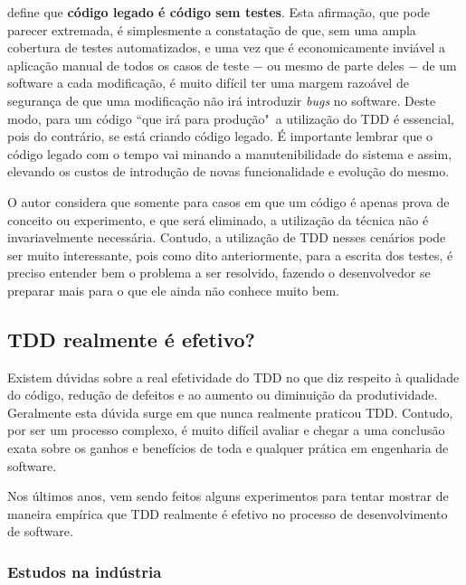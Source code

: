 define que \textbf{código legado é código sem testes}. Esta afirmação, que pode parecer extremada, é simplesmente a constatação de que, sem uma ampla cobertura de testes automatizados, e uma vez que é economicamente inviável a aplicação manual de todos os casos de teste $-$ ou mesmo de parte deles $-$ de um software a cada modificação, é muito difícil ter uma margem razoável de segurança de que uma modificação não irá introduzir \textit{bugs} no software. Deste modo, para um código ``que irá para produção"\ a utilização do TDD é essencial, pois do contrário, se está criando código legado. É importante lembrar que o código legado com o tempo vai minando a manutenibilidade do sistema e assim, elevando os custos de introdução de novas funcionalidade e evolução do mesmo.

O autor considera que somente para casos em que um código é apenas prova de conceito ou experimento, e que será eliminado, a utilização da técnica não é invariavelmente necessária. Contudo, a utilização de TDD nesses cenários pode ser muito interessante, pois como dito anteriormente, para a escrita dos testes, é preciso entender bem o problema a ser resolvido, fazendo o desenvolvedor se preparar mais para o que ele ainda não conhece muito bem.


\subsection{TDD realmente é efetivo?} %
\label{sub:tdd_realmente_e_efetivo}

Existem dúvidas sobre a real efetividade do TDD no que diz respeito à qualidade do código, redução de defeitos e ao aumento ou diminuição da produtividade. Geralmente esta dúvida surge em que nunca realmente praticou TDD. Contudo, por ser um processo complexo, é muito difícil avaliar e chegar a uma conclusão exata sobre os ganhos e benefícios de toda e qualquer prática em engenharia de software.

Nos últimos anos, vem sendo feitos alguns experimentos para tentar mostrar de maneira empírica que TDD realmente é efetivo no processo de desenvolvimento de software.

\subsubsection{Estudos na indústria} %
\label{sub:estudos_na_industria}

